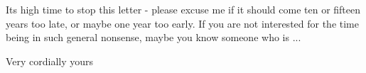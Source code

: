
Its high time to stop this letter - please excuse me if it should
come ten or fifteen years too late, or maybe one year too early. If you
are not interested for the time being in such general nonsense, maybe
you know someone who is ...

Very cordially yours\hand{,} \over{-}{-} 

